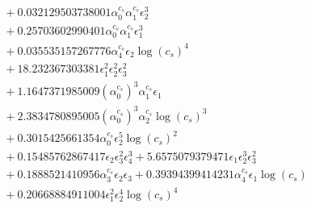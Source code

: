 \documentclass[10pt]{article}
\begin{document}
\begin{align*}
&{}  + 0.032129503738001 \alpha_{0}^{c_s} \alpha_{1}^{c_s} \epsilon_{2}^{3} \\
&{}  + 0.25703602990401 \alpha_{0}^{c_s} \alpha_{1}^{c_s} \epsilon_{1}^{3} \\
&{}  + 0.035535157267776 \alpha_{4}^{c_s} \epsilon_{2} \log{\left(c_{s} \right)}^{4} \\
&{}  + 18.232367303381 \epsilon_{1}^{2} \epsilon_{2}^{2} \epsilon_{3}^{2} \\
&{}  + 1.1647371985009 \left(\alpha_{0}^{c_s}\right)^{3} \alpha_{1}^{c_s} \epsilon_{1} \\
&{}  + 2.3834780895005 \left(\alpha_{0}^{c_s}\right)^{3} \alpha_{2}^{c_s} \log{\left(c_{s} \right)}^{3} \\
&{}  + 0.3015425661354 \alpha_{0}^{c_s} \epsilon_{2}^{5} \log{\left(c_{s} \right)}^{2} \\
&{}  + 0.15485762867417 \epsilon_{2} \epsilon_{3}^{2} \epsilon_{4}^{3} + 5.6575079379471 \epsilon_{1} \epsilon_{2}^{3} \epsilon_{3}^{2} \\
&{}  + 0.1888521410956 \alpha_{3}^{c_s} \epsilon_{2} \epsilon_{3} + 0.39394399414231 \alpha_{4}^{c_s} \epsilon_{1} \log{\left(c_{s} \right)} \\
&{}  + 0.20668884911004 \epsilon_{1}^{2} \epsilon_{2}^{4} \log{\left(c_{s} \right)}^{4}
\end{align*}
\end{document}
